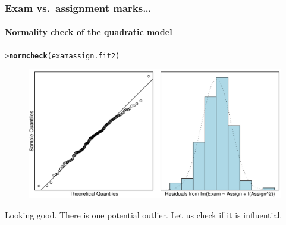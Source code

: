 \documentclass{beamer}\usepackage[]{graphicx}\usepackage[]{xcolor}
\makeatletter
\newcommand{\hlstd}[1]{\textcolor[rgb]{0.345,0.345,0.345}{#1}}%
\newcommand{\hlkwd}[1]{\textcolor[rgb]{0.737,0.353,0.396}{\textbf{#1}}}%
\newenvironment{kframe}{%
 \def\at@end@of@kframe{}%
 \ifinner\ifhmode%
  \def\at@end@of@kframe{\end{minipage}}%
  \begin{minipage}{\columnwidth}%
 \fi\fi%
 \def\FrameCommand##1{\hskip\@totalleftmargin \hskip-\fboxsep
 \colorbox{shadecolor}{##1}\hskip-\fboxsep
     \hskip-\linewidth \hskip-\@totalleftmargin \hskip\columnwidth}%
 \MakeFramed {\advance\hsize-\width
   \@totalleftmargin\z@ \linewidth\hsize
   \@setminipage}}%
 {\par\unskip\endMakeFramed%
 \at@end@of@kframe}
\newenvironment{knitrout}{}{} %
\makeatother
\begin{document}
\begin{frame}[ fragile]
\frametitle{Exam vs.\ assignment marks\ldots}
\framesubtitle{Normality check of the quadratic model}
\begin{knitrout}\scriptsize
{}\color{fgcolor}\begin{kframe}
\begin{alltt}
\hlstd{> }\hlkwd{normcheck}\hlstd{(examassign.fit2)}
\end{alltt}
\end{kframe}
\end{knitrout}



\begin{figure}
  \centering
  \includegraphics[scale=0.5]{figure/RC-H04-014}
\end{figure}
 
Looking good. There is one potential outlier. Let us check if it is influential.
\end{frame}
\end{document}
